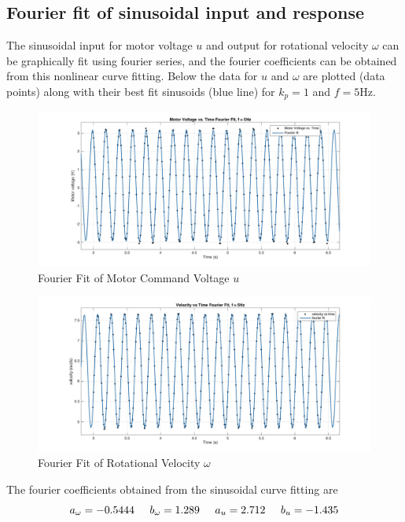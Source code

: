 \documentclass[11pt,titlepage]{article}
\begin{document}
    \subsection{Fourier fit of sinusoidal input and response}   
        The sinusoidal input for motor voltage $u$ and output for rotational velocity $\omega$ can be graphically fit using fourier series, and the fourier coefficients can be obtained from this nonlinear curve fitting. Below the data for $u$ and $\omega$ are plotted (data points) along with their best fit sinusoids (blue line) for $k_p=1$ and $f=5$Hz.
        \begin{figure}[H]
            \centering
            \includegraphics[scale=0.25]{fourier_volt_5Hz}
            \caption{Fourier Fit of Motor Command Voltage $u$}
            \label{fig:fourier_volt_5Hz}
        \end{figure}
        \begin{figure}[H]
            \centering
            \includegraphics[scale=0.25]{fourier_vel_5Hz}
            \caption{Fourier Fit of Rotational Velocity $\omega$}
            \label{fig:fourier_vel_5Hz}
        \end{figure}
        \noindent The fourier coefficients obtained from the sinusoidal curve fitting are
        \begin{equation}
            a_{\omega}=-0.5444\hspace{0.5cm}b_{\omega}=1.289\hspace{0.5cm}a_u=2.712\hspace{0.5cm}b_u=-1.435\nonumber
        \end{equation}
\end{document}
